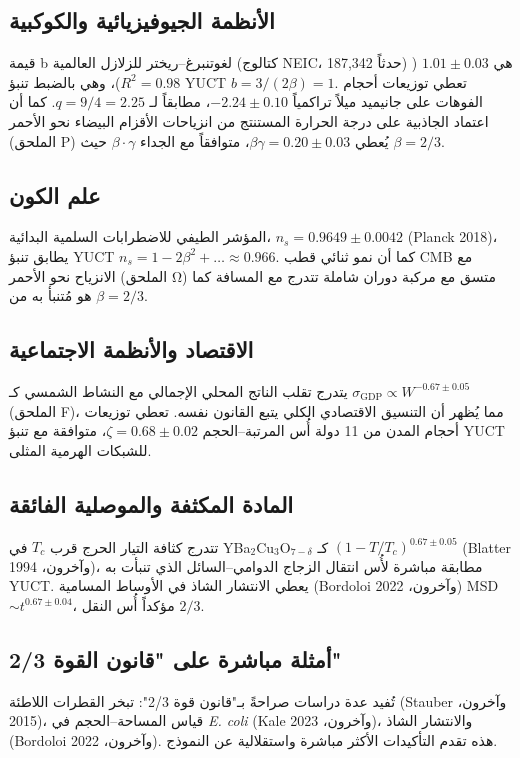\documentclass[11pt,a4paper]{article}
\newcommand{\betaf}{\beta}
\begin{document}
	\subsection{الأنظمة الجيوفيزيائية والكوكبية}
	قيمة b لغوتنبرغ–ريختر للزلازل العالمية (كتالوج NEIC، 187,342 حدثاً) هي \(1.01\pm0.03\) (\(R^2=0.98\))، وهي بالضبط تنبؤ YUCT \(b = 3/(2\betaf) = 1\). تعطي توزيعات أحجام الفوهات على جانيميد ميلاً تراكمياً \(-2.24\pm0.10\)، مطابقاً لـ \(q = 9/4 = 2.25\). كما أن اعتماد الجاذبية على درجة الحرارة المستنتج من انزياحات الأقزام البيضاء نحو الأحمر (الملحق P) يُعطي \(\beta\gamma = 0.20 \pm 0.03\)، متوافقاً مع الجداء \(\betaf \cdot \gamma\) حيث \(\betaf = 2/3\).
	
	\subsection{علم الكون}
	المؤشر الطيفي للاضطرابات السلمية البدائية، \(n_s = 0.9649\pm0.0042\) (Planck 2018)، يطابق تنبؤ YUCT \(n_s = 1 - 2\betaf^2 + \dots \approx 0.966\). كما أن نمو ثنائي قطب CMB مع الانزياح نحو الأحمر (الملحق Ω) متسق مع مركبة دوران شاملة تتدرج مع المسافة كما هو مُتنبأ به من \(\betaf = 2/3\).
	
	\subsection{الاقتصاد والأنظمة الاجتماعية}
	يتدرج تقلب الناتج المحلي الإجمالي مع النشاط الشمسي كـ \(\sigma_{\text{GDP}} \propto W^{-0.67\pm0.05}\) (الملحق F)، مما يُظهر أن التنسيق الاقتصادي الكلي يتبع القانون نفسه. تعطي توزيعات أحجام المدن من 11 دولة أُس المرتبة–الحجم \(\zeta = 0.68\pm0.02\)، متوافقة مع تنبؤ YUCT للشبكات الهرمية المثلى.
	
	\subsection{المادة المكثفة والموصلية الفائقة}
	تتدرج كثافة التيار الحرج قرب \(T_c\) في YBa\(_2\)Cu\(_3\)O\(_{7-\delta}\) كـ \((1-T/T_c)^{0.67\pm0.05}\) (Blatter وآخرون، 1994)، مطابقة مباشرة لأُس انتقال الزجاج الدوامي–السائل الذي تنبأت به YUCT. يعطي الانتشار الشاذ في الأوساط المسامية (Bordoloi وآخرون، 2022) MSD \(\sim t^{0.67\pm0.04}\)، مؤكداً أُس النقل \(2/3\).
	
	\subsection{أمثلة مباشرة على "قانون القوة 2/3"}
	تُفيد عدة دراسات صراحةً بـ"قانون قوة 2/3": تبخر القطرات اللاطئة (Stauber وآخرون، 2015)، قياس المساحة–الحجم في \emph{E. coli} (Kale وآخرون، 2023)، والانتشار الشاذ (Bordoloi وآخرون، 2022). هذه تقدم التأكيدات الأكثر مباشرة واستقلالية عن النموذج.
	
\end{document}
